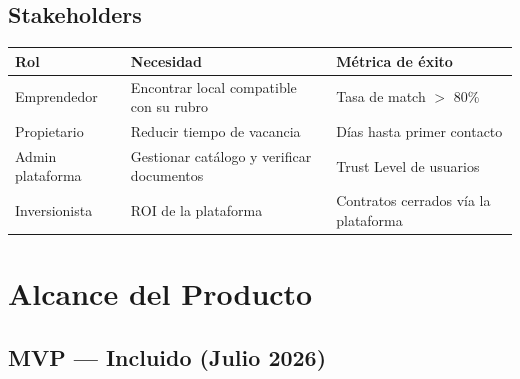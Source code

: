 \documentclass[11pt,a4paper]{article}
\begin{document}
\subsection{Stakeholders}

\begin{table}[H]
    \centering
    \renewcommand{\arraystretch}{1.2}
    \begin{tabularx}{\textwidth}{>{\hsize=0.2\hsize}X >{\hsize=0.4\hsize}X >{\hsize=0.4\hsize}X}
        \toprule
        \textbf{Rol} & \textbf{Necesidad} & \textbf{Métrica de éxito} \\
        \midrule
        Emprendedor & Encontrar local compatible con su rubro & Tasa de match $>$ 80\% \\
        Propietario & Reducir tiempo de vacancia & Días hasta primer contacto \\
        Admin plataforma & Gestionar catálogo y verificar documentos & Trust Level de usuarios \\
        Inversionista & ROI de la plataforma & Contratos cerrados vía la plataforma \\
        \bottomrule
    \end{tabularx}
\end{table}

\section{Alcance del Producto}

\subsection{MVP — Incluido (Julio 2026)}
\end{document}
